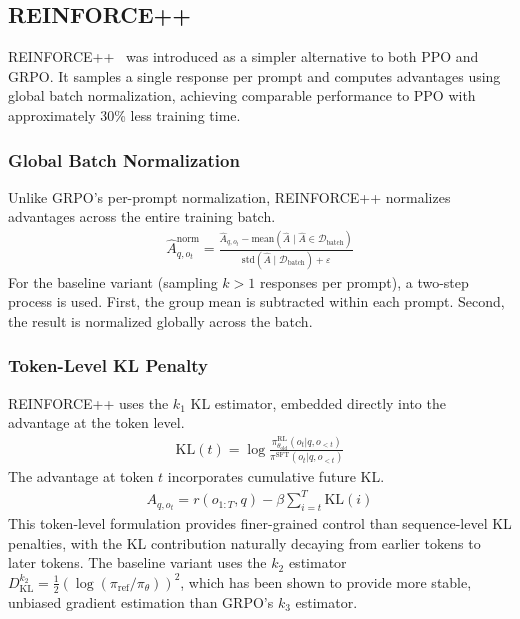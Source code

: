 \documentclass[12pt]{article}
\begin{document}
\subsection{REINFORCE++}

REINFORCE++~\cite{Hu2025Reinforce} was introduced as a simpler alternative to both PPO and GRPO. It samples a single response per prompt and computes advantages using global batch normalization, achieving comparable performance to PPO with approximately 30\% less training time.

\subsubsection{Global Batch Normalization}

Unlike GRPO's per-prompt normalization, REINFORCE++ normalizes advantages across the entire training batch.
\begin{align}
\hat{A}_{q, o_t}^{\text{norm}} = \frac{\hat{A}_{q, o_t} - \text{mean}(\hat{A} \mid \hat{A} \in \mathcal{D}_{\text{batch}})}{\text{std}(\hat{A} \mid \mathcal{D}_{\text{batch}}) + \varepsilon}
\end{align}
For the baseline variant (sampling $k > 1$ responses per prompt), a two-step process is used. First, the group mean is subtracted within each prompt. Second, the result is normalized globally across the batch.

\subsubsection{Token-Level KL Penalty}

REINFORCE++ uses the $k_1$ KL estimator, embedded directly into the advantage at the token level.
\begin{align}
\text{KL}(t) = \log \frac{\pi_{\theta_{\text{old}}}^{\text{RL}}(o_t | q, o_{<t})}{\pi^{\text{SFT}}(o_t | q, o_{<t})}
\end{align}
The advantage at token $t$ incorporates cumulative future KL.
\begin{align}
A_{q, o_t} = r(o_{1:T}, q) - \beta \sum_{i=t}^{T} \text{KL}(i)
\end{align}
This token-level formulation provides finer-grained control than sequence-level KL penalties, with the KL contribution naturally decaying from earlier tokens to later tokens. The baseline variant uses the $k_2$ estimator $D_{\text{KL}}^{k_2} = \frac{1}{2}(\log(\pi_{\text{ref}} / \pi_\theta))^2$, which has been shown to provide more stable, unbiased gradient estimation than GRPO's $k_3$ estimator.
\end{document}
